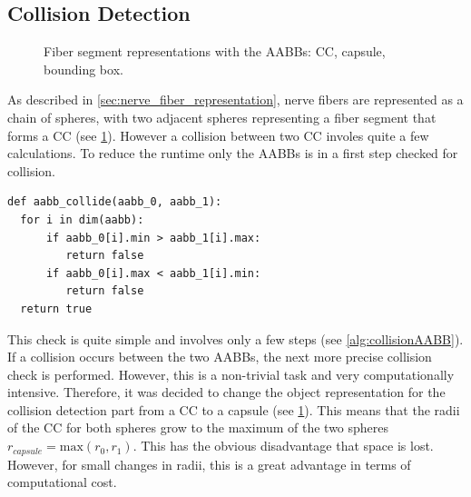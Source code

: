 \subsection{Collision Detection}
\label{sec:collisionDetection}
%
\begin{figure}[!t]
    \centering
    \setlength{\tikzwidth}{0.6\textwidth}
    \tikzset{external/export=false}
	\caption[]{Fiber segment representations with the \acp{AABB}:  \ac{CC},  capsule,  bounding box.}
	\label{fig:conical_capsule}
\end{figure}
% 
As described in \cref{sec:nerve_fiber_representation}, nerve fibers are represented as a chain of spheres, with two adjacent spheres representing a fiber segment that forms a \ac{CC} (see \cref{fig:conical_capsule}).
However a collision between two \ac{CC} involes quite a few calculations. To reduce the runtime only the \acp{AABB} is in a first step checked for collision.
%
\begin{lstfloat}[!tb]
\lstset{style=python}
\begin{lstlisting}[]
def aabb_collide(aabb_0, aabb_1):
  for i in dim(aabb):
      if aabb_0[i].min > aabb_1[i].max:
         return false
      if aabb_0[i].max < aabb_1[i].min:
         return false
  return true
\end{lstlisting}
\caption{Calculation if a collission between \acp{AABB} exists.}
\label{alg:collisionAABB}
\end{lstfloat}
%
This check is quite simple and involves only a few steps (see \cref{alg:collisionAABB}).
If a collision occurs between the two \acp{AABB}, the next more precise collision check is performed.
However, this is a non-trivial task and very computationally intensive.
Therefore, it was decided to change the object representation for the collision detection part from a \ac{CC} to a capsule (see \cref{fig:conical_capsule}).
This means that the radii of the \ac{CC} for both spheres grow to the maximum of the two spheres $r_{\mathit{capsule}} = \mathrm{max}(r_0, r_1)$.
This has the obvious disadvantage that space is lost. However, for small changes in radii, this is a great advantage in terms of computational cost.
\par
% 
